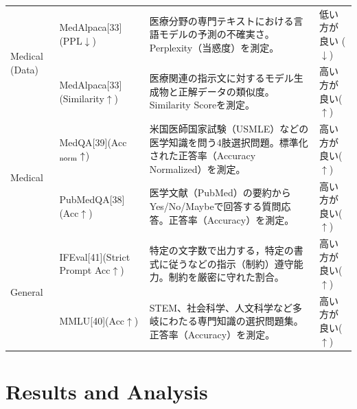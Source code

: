 \documentclass{article}
\begin{document}
\begin{table}[H]
\begin{tabularx}{\textwidth}{p{2.0cm}p{3.3cm}Xp{2.2cm}}
\midrule
\multirow{2}{*}{Medical (Data)}
& MedAlpaca[33](PPL$\downarrow$) & 医療分野の専門テキストにおける言語モデルの予測の不確実さ。Perplexity（当惑度）を測定。 & 低い方が良い ($\downarrow$) \\
& MedAlpaca[33](Similarity$\uparrow$) & 医療関連の指示文に対するモデル生成物と正解データの類似度。Similarity Scoreを測定。 & 高い方が良い($\uparrow$) \\
\midrule
\multirow{2}{*}{Medical}
& MedQA[39](Acc$_{\rm norm}\uparrow$) & 米国医師国家試験（USMLE）などの医学知識を問う4肢選択問題。標準化された正答率（Accuracy Normalized）を測定。 & 高い方が良い($\uparrow$) \\
& PubMedQA[38](Acc$\uparrow$) & 医学文献（PubMed）の要約からYes/No/Maybeで回答する質問応答。正答率（Accuracy）を測定。 & 高い方が良い($\uparrow$) \\
\midrule
\multirow{2}{*}{General}
& IFEval[41](Strict Prompt Acc$\uparrow$) & 特定の文字数で出力する，特定の書式に従うなどの指示（制約）遵守能力。制約を厳密に守れた割合。 & 高い方が良い($\uparrow$) \\
& MMLU[40](Acc$\uparrow$) & STEM、社会科学、人文科学など多岐にわたる専門知識の選択問題集。正答率（Accuracy）を測定。 & 高い方が良い($\uparrow$) \\
\bottomrule
\end{tabularx}
\end{table}


\section{Results and Analysis}
\end{document}
